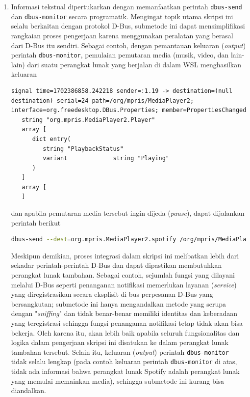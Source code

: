 \begin{enumerate}
\begin{enumerate}
\begin{verbatim}
        \end{verbatim}

        \item Informasi tekstual dipertukarkan dengan memanfaatkan perintah \verb|dbus-send| dan \verb|dbus-monitor| secara programatik. Mengingat topik utama skripsi ini selalu berkaitan dengan protokol D-Bus, submetode ini dapat mensimplifikasi rangkaian proses pengerjaan karena menggunakan peralatan yang berasal dari D-Bus itu sendiri. Sebagai contoh, dengan pemantauan keluaran (\textit{output}) perintah \verb|dbus-monitor|, pemulaian pemutaran media (musik, video, dan lain-lain) dari suatu perangkat lunak yang berjalan di dalam WSL menghasilkan keluaran
        \begin{lstlisting}
signal time=1702386858.242218 sender=:1.19 -> destination=(null destination) serial=24 path=/org/mpris/MediaPlayer2; interface=org.freedesktop.DBus.Properties; member=PropertiesChanged
   string "org.mpris.MediaPlayer2.Player"
   array [
      dict entry(
         string "PlaybackStatus"
         variant             string "Playing"
      )
   ]
   array [
   ]\end{lstlisting}
        dan apabila pemutaran media tersebut ingin dijeda (\textit{pause}), dapat dijalankan perintah berikut
        \begin{lstlisting}[language=bash]
dbus-send --dest=org.mpris.MediaPlayer2.spotify /org/mpris/MediaPlayer2 org.mpris.MediaPlayer2.Player.PlayPause\end{lstlisting}
        Meskipun demikian, proses integrasi dalam skripsi ini melibatkan lebih dari sekadar perintah-perintah D-Bus dan dapat dipastikan membutuhkan perangkat lunak tambahan. Sebagai contoh, sejumlah fungsi yang dilayani melalui D-Bus seperti penanganan notifikasi memerlukan layanan (\textit{service}) yang diregistrasikan secara eksplisit di bus perpesanan D-Bus yang bersangkutan; submetode ini hanya mengandalkan metode yang serupa dengan "\textit{sniffing}" dan tidak benar-benar memiliki identitas dan keberadaan yang teregistrasi sehingga fungsi penanganan notifikasi tetap tidak akan bisa bekerja. Oleh karena itu, akan lebih baik apabila seluruh fungsionalitas dan logika dalam pengerjaan skripsi ini disatukan ke dalam perangkat lunak tambahan tersebut. Selain itu, keluaran (\textit{output}) perintah \verb|dbus-monitor| tidak selalu lengkap (pada contoh keluaran perintah \verb|dbus-monitor| di atas, tidak ada informasi bahwa perangkat lunak Spotify adalah perangkat lunak yang memulai memainkan media), sehingga submetode ini kurang bisa diandalkan.
    \end{enumerate}
    

\end{enumerate}
